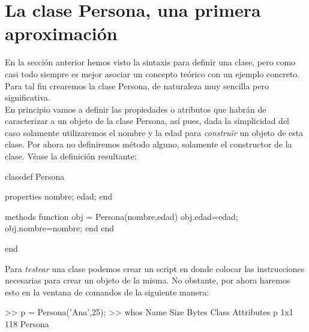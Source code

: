 \section{La clase Persona, una primera
aproximación}\label{la-clase-persona-una-primera-aproximaciuxf3n}

En la sección anterior hemos visto la sintaxis para definir una clase,
pero como casi todo siempre es mejor asociar un concepto teórico con un
ejemplo concreto. Para tal fin crearemos la clase Persona, de naturaleza
muy sencilla pero significativa. \\

En principio vamos a definir las propiedades o atributos que habrán de
caracterizar a un objeto de la clase Persona, así pues, dada la
simplicidad del caso solamente utilizaremos el nombre y la edad para
\emph{construir} un objeto de esta clase. Por ahora no definiremos
método alguno, solamente el constructor de la clase. Véase la definición
resultante:

\begin{matlab}
classdef Persona
    
    properties %
        nombre;
        edad;
    end
    
    methods
        function obj = Persona(nombre,edad) %
            obj.edad=edad;
            obj.nombre=nombre;
        end
    end
    
end
\end{matlab}

Para \emph{testear} una clase podemos crear un script en donde colocar
las instrucciones necesarias para crear un objeto de la misma. No
obstante, por ahora haremos esto en la ventana de comandos de la
siguiente manera:

\begin{matlab}
>> p = Persona('Ana',25);
>> whos
  Name      Size            Bytes  Class      Attributes
  p         1x1               118  Persona        
\end{matlab}
